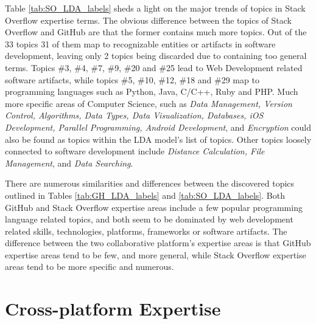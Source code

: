             Table \ref{tab:SO_LDA_labels} sheds a light on the major trends of topics in Stack Overflow expertise terms. The obvious difference between the topics of Stack Overflow and GitHub are that the former contains much more topics. Out of the 33 topics 31 of them map to recognizable entities or artifacts in software development, leaving only 2 topics being discarded due to containing too general terms. Topics \#3, \#4, \#7, \#9, \#20 and \#25 lead to Web Development related software artifacts, while topics \#5, \#10, \#12, \#18 and \#29 map to programming languages such as Python, Java, C/C++, Ruby and PHP. Much more specific areas of Computer Science, such as \emph{Data Management, Version Control, Algorithms, Data Types, Data Visualization, Databases, iOS Development, Parallel Programming, Android Development}, and \emph{Encryption} could also be found as topics within the LDA model's list of topics. Other topics loosely connected to software development include \emph{Distance Calculation, File Management}, and \emph{Data Searching}.
            
            There are numerous similarities and differences between the discovered topics outlined in Tables \ref{tab:GH_LDA_labels} and \ref{tab:SO_LDA_labels}. Both GitHub and Stack Overflow expertise areas include a few popular programming language related topics, and both seem to be dominated by web development related skills, technologies, platforms, frameworks or software artifacts. The difference between the two collaborative platform's expertise areas is that GitHub expertise areas tend to be few, and more general, while Stack Overflow expertise areas tend to be more specific and numerous.  \\
        
    
    \section{Cross-platform Expertise\label{sec:results_rq2}}
        

